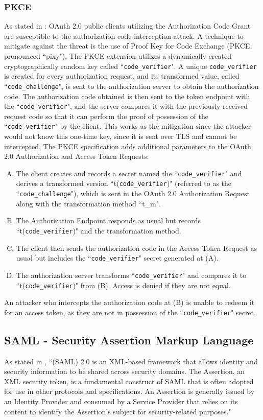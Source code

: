 \subsubsection{PKCE}
As stated in \cite{pkce_downgrade}: OAuth 2.0 public clients utilizing the Authorization Code Grant are susceptible to the authorization code interception attack. A technique to mitigate against the threat is the use of Proof Key for Code Exchange (PKCE, pronounced ``pixy"). The PKCE extension utilizes a dynamically created cryptographically random key called ``\texttt{code\_verifier}".  A unique \texttt{code\_verifier} is created for every authorization request, and its transformed value, called ``\texttt{code\_challenge}", is sent to the authorization server to obtain the authorization code.  The authorization code obtained is then sent to the token endpoint with the ``\texttt{code\_verifier}", and the server compares it with the previously received request code so that it can perform the proof of possession of the ``\texttt{code\_verifier}" by the client.  This works as the mitigation since the attacker would not know this one-time key, since it is sent over TLS and cannot be intercepted.
The PKCE specification adds additional parameters to the OAuth 2.0 Authorization and Access Token Requests:
\begin{enumerate}[(A)]
    \item The client creates and records a secret named the ``\texttt{code\_verifier}" and derives a transformed version ``t(\texttt{code\_verifier})" (referred to as the ``\texttt{code\_challenge}"), which is sent in the OAuth 2.0 Authorization Request along with the transformation method ``t\_m". 
    \item The Authorization Endpoint responds as usual but records ``t(\texttt{code\_verifier})" and the transformation method. 
    \item The client then sends the authorization code in the Access Token Request as usual but includes the ``\texttt{code\_verifier}" secret generated at (A). 
    \item The authorization server transforms ``\texttt{code\_verifier}" and compares it to ``t(\texttt{code\_verifier})" from (B).  Access is denied if they are not equal.
\end{enumerate}
An attacker who intercepts the authorization code at (B) is unable to redeem it for an access token, as they are not in possession of the ``\texttt{code\_verifier}" secret.

\subsection{SAML - Security Assertion Markup Language}
As stated in \cite{ietf_SAML}, ``(\Gls{SAML}) 2.0 is an XML-based framework that allows identity and security information to be shared across security domains. The Assertion, an XML security token, is a fundamental construct of \Gls{SAML} that is often adopted for use in other protocols and specifications. An Assertion is generally issued by an Identity Provider and consumed by a Service Provider that relies on its content to identify the Assertion's subject for security-related purposes."





